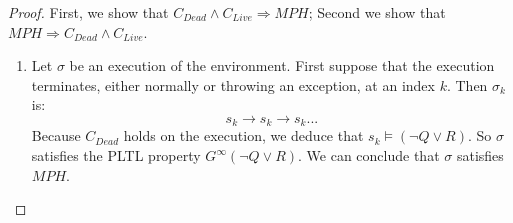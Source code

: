 \begin{proof}


First, we show that $C_{Dead} \wedge C_{Live} \Rightarrow MPH$; 
Second we show that $MPH \Rightarrow  C_{Dead} \wedge C_{Live} $.
\begin{enumerate}
\item Let $\sigma$ be an execution of the environment. 
   First suppose that the execution terminates, either
        normally or throwing an exception, at an index $k$. Then $\sigma_k$
        is:
        $$ s_k \rightarrow s_k \rightarrow s_k ...$$
        Because $C_{Dead}$ holds on the execution, we deduce that 
        $s_k \models (\neg Q \vee R)$. So $\sigma$ satisfies the 
        \textsf{PLTL} property $G^{\infty}(\neg Q \vee R)$. We can 
        conclude that $\sigma$ satisfies $MPH$.


\end{enumerate}
\end{proof}
